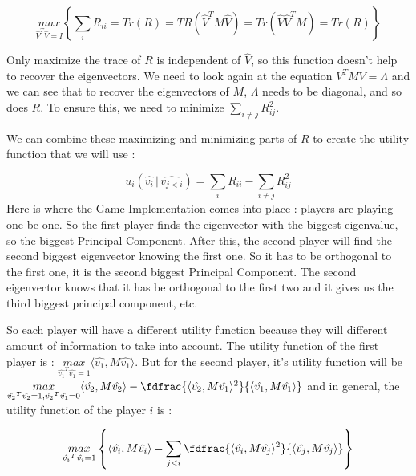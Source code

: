 \begin{equation}
    \underset{\hat{V}^T \hat{V} = I}{max} \left\{ \sum\limits_{i} R_{ii} = Tr(R) = TR\left(\hat{V}^T M \hat{V}\right) = Tr\left(\hat{V} \hat{V}^T M\right) = Tr(R) \right\}
\end{equation}


Only maximize the trace of $R$ is independent of $\hat{V}$, so this function doesn't help to recover the eigenvectors. We need to look again at the equation $V^T M V = \Lambda$ and we can see that to recover the eigenvectors of $M$, $\Lambda$ needs to be diagonal, and so does $R$. To ensure this, we need to minimize $\displaystyle \sum\limits_{i \neq j} R_{ij}^2$.

We can combine these maximizing and minimizing parts of $R$ to create the utility function that we will use :

\begin{equation}
  u_i(\hat{v_i} \, | \, \hat{v_{j < i}}) = \sum\limits_i R_{ii} - \sum\limits_{i \neq j} R_{ij}^2
\end{equation}
Here is where the Game Implementation comes into place : players are playing one be one. So the first player finds the eigenvector with the biggest eigenvalue, so the biggest Principal Component. After this, the second player will find the second biggest eigenvector knowing the first one. So it has to be orthogonal to the first one, it is the second biggest Principal Component. The second eigenvector knows that it has be orthogonal to the first two and it gives us the third biggest principal component, etc.

So each player will have a different utility function because they will different amount of information to take into account. The utility function of the first player is : $\underset{\hat{v_1}^T \hat{v_1} = 1}{max} \langle \hat{v_1}, M \hat{v_1} \rangle$. But for the second player, it's utility function will be $\underset{\hat{v_2}^T \hat{v_2} = 1, \hat{v_2}^T \hat{v_1} = 0}{max} \langle \hat{v_2}, M \hat{v_2}\rangle - \fdfrac{\langle \hat{v_2}, M \hat{v_1}\rangle^2}{\langle \hat{v_1}, M \hat{v_1}\rangle}$ and in general, the utility function of the player $i$ is :

\begin{equation}
  \underset{\hat{v_i}^T \hat{v_i} = 1}{max} \left\{ \langle \hat{v_i}, M \hat{v_i}\rangle - \sum\limits_{j < i} \fdfrac{\langle \hat{v_i}, M \hat{v_j}\rangle^2}{\langle \hat{v_j}, M \hat{v_j}\rangle} \right\}
\end{equation}

